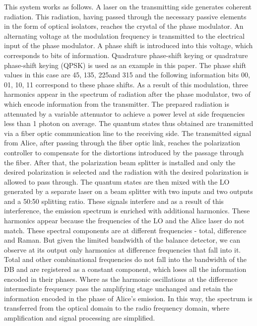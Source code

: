 This system works as follows. A laser on the transmitting side generates coherent radiation. This radiation, having passed through the necessary passive elements in the form of optical isolators, reaches the crystal of the phase modulator. An alternating voltage at the modulation frequency is transmitted to the electrical input of the phase modulator. A phase shift is introduced into this voltage, which corresponds to bits of information. Quadrature phase-shift keying or quadrature phase-shift keying (QPSK) is used as an example in this paper. The phase shift values in this case are {45\textdegree, 135\textdegree, 225\textdegree and 315\textdegree} and the following information bits {00, 01, 10, 11} correspond to these phase shifts. As a result of this modulation, three harmonics appear in the spectrum of radiation after the phase modulator, two of which encode information from the transmitter. The prepared radiation is attenuated by a variable attenuator to achieve a power level at side frequencies less than 1 photon on average. The quantum states thus obtained are transmitted via a fiber optic communication line to the receiving side.  
\newline The transmitted signal from Alice, after passing through the fiber optic link, reaches the polarization controller to compensate for the distortions introduced by the passage through the fiber. After that, the polarization beam splitter is installed and only the desired polarization is selected and the radiation with the desired polarization is allowed to pass through. The quantum states are then mixed with the LO generated by a separate laser on a beam splitter with two inputs and two outputs and a 50:50 splitting ratio. These signals interfere and as a result of this interference, the emission spectrum is enriched with additional harmonics. These harmonics appear because the frequencies of the LO and the Alice laser do not match. These spectral components are at different frequencies - total, difference and Raman. But given the limited bandwidth of the balance detector, we can observe at its output only harmonics at difference frequencies that fall into it. Total and other combinational frequencies do not fall into the bandwidth of the DB and are registered as a constant component, which loses all the information encoded in their phases. Where as the harmonic oscillations at the difference intermediate frequency pass the amplifying stage unchanged and retain the information encoded in the phase of Alice's emission. In this way, the spectrum is transferred from the optical domain to the radio frequency domain, where amplification and signal processing are simplified.

